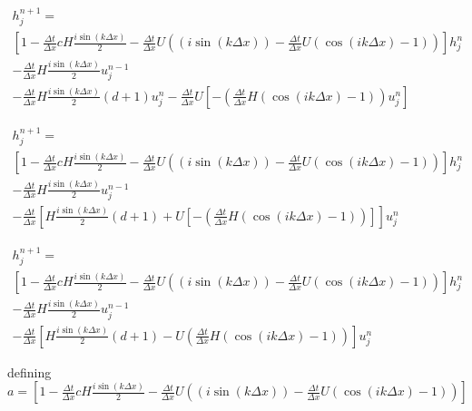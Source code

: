 \documentclass[12pt]{article}
\begin{document}
\begin{multline}
h^{n+1}_{j} = \\\left[1 - \frac{\Delta t}{\Delta x}cH\frac{i\sin\left(k\Delta x\right)}{2} - \frac{\Delta t}{\Delta x}U\left(\left(i\sin\left(k\Delta x\right)\right) - \frac{\Delta t}{\Delta x}U\left(\cos\left(ik\Delta x\right) - 1\right)\right) \right]h^n_j \\ - \frac{\Delta t}{\Delta x}H\frac{i\sin\left(k\Delta x\right)}{2}u^{n-1}_j \\ - \frac{\Delta t}{\Delta x}H\frac{i\sin\left(k\Delta x\right)}{2}(d+1)u^n_j - \frac{\Delta t}{\Delta x}U\left[ - \left(\frac{\Delta t}{\Delta x}H\left(\cos\left(ik\Delta x\right) - 1\right)\right)u^n_j\right]
\end{multline}

\begin{multline}
h^{n+1}_{j} = \\\left[1 - \frac{\Delta t}{\Delta x}cH\frac{i\sin\left(k\Delta x\right)}{2} - \frac{\Delta t}{\Delta x}U\left(\left(i\sin\left(k\Delta x\right)\right) - \frac{\Delta t}{\Delta x}U\left(\cos\left(ik\Delta x\right) - 1\right)\right) \right]h^n_j \\ - \frac{\Delta t}{\Delta x}H\frac{i\sin\left(k\Delta x\right)}{2}u^{n-1}_j \\ - \frac{\Delta t}{\Delta x} \left[H\frac{i\sin\left(k\Delta x\right)}{2}(d+1)  +U\left[ - \left(\frac{\Delta t}{\Delta x}H\left(\cos\left(ik\Delta x\right) - 1\right)\right) \right]\right]u^n_j
\end{multline}

\begin{multline}
h^{n+1}_{j} = \\\left[1 - \frac{\Delta t}{\Delta x}cH\frac{i\sin\left(k\Delta x\right)}{2} - \frac{\Delta t}{\Delta x}U\left(\left(i\sin\left(k\Delta x\right)\right) - \frac{\Delta t}{\Delta x}U\left(\cos\left(ik\Delta x\right) - 1\right)\right) \right]h^n_j \\ - \frac{\Delta t}{\Delta x}H\frac{i\sin\left(k\Delta x\right)}{2}u^{n-1}_j \\ - \frac{\Delta t}{\Delta x} \left[H\frac{i\sin\left(k\Delta x\right)}{2}(d+1)   -U\left(\frac{\Delta t}{\Delta x}H\left(\cos\left(ik\Delta x\right) - 1\right)\right) \right]u^n_j
\end{multline}

defining
$a = \left[1 - \frac{\Delta t}{\Delta x}cH\frac{i\sin\left(k\Delta x\right)}{2} - \frac{\Delta t}{\Delta x}U\left(\left(i\sin\left(k\Delta x\right)\right) - \frac{\Delta t}{\Delta x}U\left(\cos\left(ik\Delta x\right) - 1\right)\right) \right]$
\end{document}
